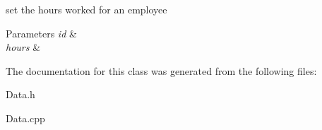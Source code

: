 set the hours worked for an employee 
\begin{DoxyParams}{Parameters}
{\em id} & \\
\hline
{\em hours} & \\
\hline
\end{DoxyParams}


The documentation for this class was generated from the following files\+:\begin{DoxyCompactItemize}
\item 
Data.\+h\item 
Data.\+cpp\end{DoxyCompactItemize}
